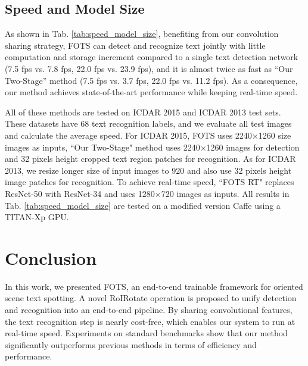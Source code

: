 \documentclass[10pt,twocolumn,letterpaper]{article}
\begin{document}
\subsection{Speed and Model Size}
\label{speed}
As shown in Tab. \ref{tab:speed_model_size}, benefiting from our convolution sharing strategy, FOTS can detect and recognize text jointly with little computation and storage increment compared to a single text detection network (7.5 fps vs. 7.8 fps, 22.0 fps vs. 23.9 fps), and it is almost twice as fast as ``Our Two-Stage'' method (7.5 fps vs. 3.7 fps, 22.0 fps vs. 11.2 fps). As a consequence, our method achieves state-of-the-art performance while keeping real-time speed.

All of these methods are tested on ICDAR 2015 and ICDAR 2013 test sets. These datasets have 68 text recognition labels, and we evaluate all test images and calculate the average speed. For ICDAR 2015, FOTS uses 2240$\times$1260 size images as inputs, ``Our Two-Stage" method uses 2240$\times$1260 images for detection and 32 pixels height cropped text region patches for recognition. As for ICDAR 2013, we resize longer size of input images to 920 and also use 32 pixels height image patches for recognition. To achieve real-time speed, ``FOTS RT" replaces ResNet-50 with ResNet-34 and uses 1280$\times$720 images as inputs. All results in Tab. \ref{tab:speed_model_size} are tested on a modified version Caffe \cite{jia2014caffe} using a TITAN-Xp GPU.

\section{Conclusion}

In this work, we presented FOTS, an end-to-end trainable framework for oriented scene text spotting. A novel RoIRotate operation is proposed to unify detection and recognition into an end-to-end pipeline. By sharing convolutional features, the text recognition step is nearly cost-free, which enables our system to run at real-time speed. Experiments on standard benchmarks show that our method significantly outperforms previous methods in terms of efficiency and performance.

{\small


}
\end{document}
